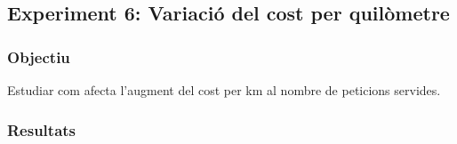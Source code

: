 
\subsection{Experiment 6: Variació del cost per quilòmetre}

\subsubsection{Objectiu}
Estudiar com afecta l'augment del cost per km al nombre de peticions servides.


\subsubsection{Resultats}


